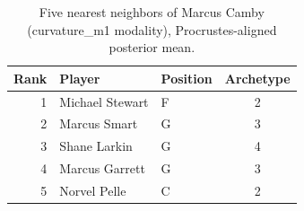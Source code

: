 \begin{table}[htbp]
  \centering\small
  \begin{tabular}{rllc}
    \toprule
    Rank & Player & Position & Archetype \\
    \midrule
    1 & Michael Stewart & F & 2 \\
    2 & Marcus Smart & G & 3 \\
    3 & Shane Larkin & G & 4 \\
    4 & Marcus Garrett & G & 3 \\
    5 & Norvel Pelle & C & 2 \\
    \bottomrule
  \end{tabular}
  \caption{Five nearest neighbors of Marcus Camby (curvature_m1 modality), Procrustes-aligned posterior mean.}
  \label{tab:Marcus_Camby_neighbors_curvature_m1}
\end{table}

